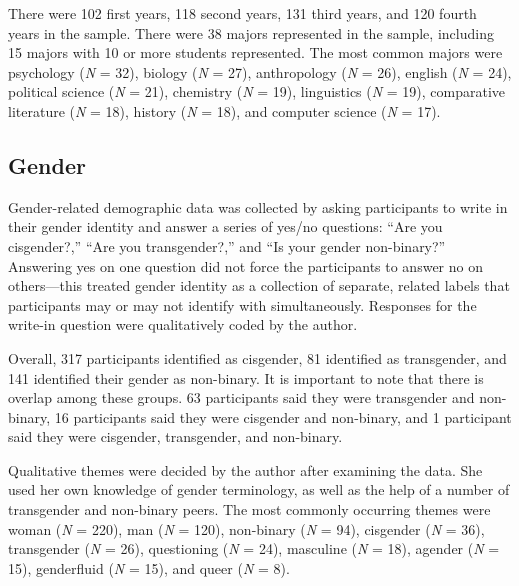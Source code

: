\documentclass[12pt,twoside]{reedthesis}
\begin{document}
There were 102 first years, 118 second years, 131 third years, and 120 fourth years in the sample. There were 38 majors represented in the sample, including 15 majors with 10 or more students represented. The most common majors were psychology (\emph{N} = 32), biology (\emph{N} = 27), anthropology (\emph{N} = 26), english (\emph{N} = 24), political science (\emph{N} = 21), chemistry (\emph{N} = 19), linguistics (\emph{N} = 19), comparative literature (\emph{N} = 18), history (\emph{N} = 18), and computer science (\emph{N} = 17).

\hypertarget{gender}{%
\subsection{Gender}\label{gender}}

Gender-related demographic data was collected by asking participants to write in their gender identity and answer a series of yes/no questions: ``Are you cisgender?,'' ``Are you transgender?,'' and ``Is your gender non-binary?'' Answering yes on one question did not force the participants to answer no on others---this treated gender identity as a collection of separate, related labels that participants may or may not identify with simultaneously. Responses for the write-in question were qualitatively coded by the author.

Overall, 317 participants identified as cisgender, 81 identified as transgender, and 141 identified their gender as non-binary. It is important to note that there is overlap among these groups. 63 participants said they were transgender and non-binary, 16 participants said they were cisgender and non-binary, and 1 participant said they were cisgender, transgender, and non-binary.

Qualitative themes were decided by the author after examining the data. She used her own knowledge of gender terminology, as well as the help of a number of transgender and non-binary peers. The most commonly occurring themes were woman (\emph{N} = 220), man (\emph{N} = 120), non-binary (\emph{N} = 94), cisgender (\emph{N} = 36), transgender (\emph{N} = 26), questioning (\emph{N} = 24), masculine (\emph{N} = 18), agender (\emph{N} = 15), genderfluid (\emph{N} = 15), and queer (\emph{N} = 8).
\end{document}
